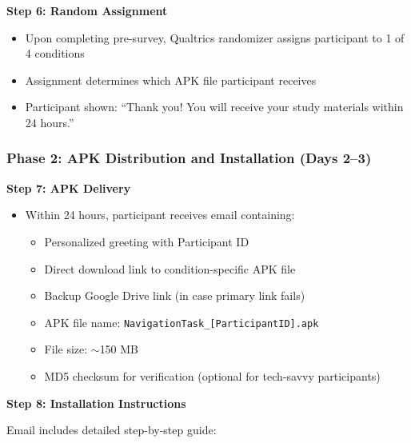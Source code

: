 \documentclass[12pt]{article}
\begin{document}
\textbf{Step 6: Random Assignment}
\begin{itemize}
    \item Upon completing pre-survey, Qualtrics randomizer assigns participant to 1 of 4 conditions
    \item Assignment determines which APK file participant receives
    \item Participant shown: ``Thank you! You will receive your study materials within 24 hours.''
\end{itemize}

\subsubsection{Phase 2: APK Distribution and Installation (Days 2--3)}

\textbf{Step 7: APK Delivery}
\begin{itemize}
    \item Within 24 hours, participant receives email containing:
    \begin{itemize}
        \item Personalized greeting with Participant ID
        \item Direct download link to condition-specific APK file
        \item Backup Google Drive link (in case primary link fails)
        \item APK file name: \texttt{NavigationTask\_[ParticipantID].apk}
        \item File size: $\sim$150 MB
        \item MD5 checksum for verification (optional for tech-savvy participants)
    \end{itemize}
\end{itemize}

\textbf{Step 8: Installation Instructions}

Email includes detailed step-by-step guide:
\end{document}
